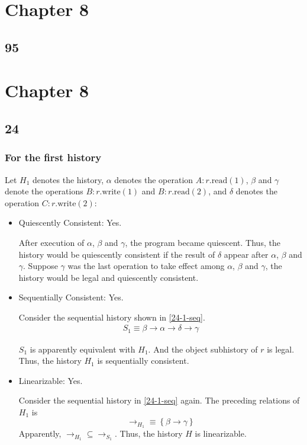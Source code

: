 \documentclass[]{article}
\begin{document}
\section*{Chapter 8}

\subsection{95}





\section*{Chapter 8}
\subsection{24}
\subsubsection*{For the first history}

Let $H_1$ denotes the history, $\alpha$ denotes the
operation $A:r.\mathrm{read}(1)$, $\beta$ and $\gamma$ denote the operations
$B:r.\mathrm{write}(1)$ and $B:r.\mathrm{read}(2)$, and $\delta$ denotes the
operation $C:r.\mathrm{write}(2)$:

\begin{itemize}
    \item Quiescently Consistent: Yes.

        After execution of $\alpha$, $\beta$ and $\gamma$, the program became
        quiescent. Thus, the history would be quiescently consistent if the
        result of $\delta$ appear after $\alpha$, $\beta$ and $\gamma$. Suppose
        $\gamma$ was the last operation to take effect among $\alpha$, $\beta$
        and $\gamma$, the history would be legal and quiescently consistent.

    \item Sequentially Consistent: Yes.

        Consider the sequential history shown in \cref{24-1-seq}.
        \begin{align}
            \label{24-1-seq}
            S_1 \equiv \beta \rightarrow \alpha \rightarrow \delta \rightarrow \gamma
        \end{align}

        $S_1$ is apparently equivalent with $H_1$. And the object subhistory of
        $r$ is legal. Thus, the history $H_1$ is sequentially consistent.

    \item Linearizable: Yes.

        Consider the sequential history in \cref{24-1-seq} again. The preceding
        relations of $H_1$ is
        \[\rightarrow_{H_1} \equiv \left\{ \beta \rightarrow \gamma \right\}\]
        Apparently, $\rightarrow_{H_1} \subseteq \rightarrow_{S_1}$. Thus, the
        history $H$ is linearizable.
\end{itemize}
\end{document}
